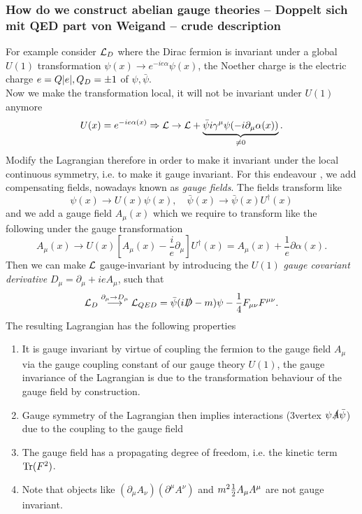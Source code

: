 \subsubsection{How do we construct abelian gauge theories -- Doppelt sich mit QED part von Weigand --  crude description}
 For example consider $\mathcal{L}_D$ where the Dirac fermion is invariant under a global $U(1)$ transformation $\psi(x)  \rightarrow e^{-i e \alpha} \psi(x)$, the Noether charge is the electric charge $e=Q \abs{e}, Q_D=\pm 1$ of $\psi,\bar{ \psi}$.\\
Now we make the transformation local, it will not be invariant under $U(1)$ anymore
\begin{equation*}
	U(x) = e^{-i e\alpha(x)} \Rightarrow \mathcal{L} \rightarrow\mathcal{L}+ \underbrace{\bar{ \psi}i \gamma^\mu \psi (-i \partial_\mu \alpha(x))}_{\neq 0}.
\end{equation*}
Modify the Lagrangian therefore in order to make it invariant under the local continuous symmetry, i.e. to make it gauge invariant. For this endeavour , we add compensating fields, nowadays known as \emph{gauge fields}. The fields transform like
\begin{equation}
	\psi(x) \rightarrow U(x) \psi(x), \quad \bar{ \psi}(x) \rightarrow\bar{ \psi}(x) U^\dagger(x)
\end{equation}
and we add a gauge field $A_\mu(x)$ which we require to transform like the following under the gauge transformation
\begin{equation}
	A_\mu(x)\rightarrow U(x) \left[A_\mu(x) - \frac{i}{e} \partial_\mu\right] U^\dagger(x) = A_\mu(x) + \frac{1}{e} \partial \alpha(x).
\end{equation}
Then we can make $\mathcal{L}$ gauge-invariant by introducing the $U(1)$ \emph{gauge covariant derivative} $D_\mu = \partial_\mu + i e A_\mu$, such that
\begin{equation}
	\mathcal{L}_D \stackrel{\partial_\mu \rightarrow D_\mu}{\longrightarrow} \mathcal{L}_{QED}=\bar{ \psi}(i \slashed{D}-m) \psi - \frac{1}{4}F_{\mu \nu} F^{\mu\nu}.
\end{equation}
The resulting Lagrangian has the following properties
\begin{enumerate}
	\item It is gauge invariant by virtue of coupling the fermion to the gauge field $A_\mu$ via the gauge coupling constant of our gauge theory $U(1)$, the gauge invariance of the Lagrangian is due to the transformation behaviour of the gauge field by construction.
	\item Gauge symmetry of the Lagrangian then implies interactions ($3$vertex $\psi \slashed{A}\bar{ \psi}$) due to the coupling to the gauge field
	\item The gauge field has a propagating degree of freedom, i.e. the kinetic term $\mathrm{Tr}(F^2)$.
	\item Note that objects like $( \partial_\mu A_\nu)(\partial^\mu A^\nu)$ and $m^2 \frac{1}{2} A_\mu A^\mu$ are not gauge invariant.
\end{enumerate}
